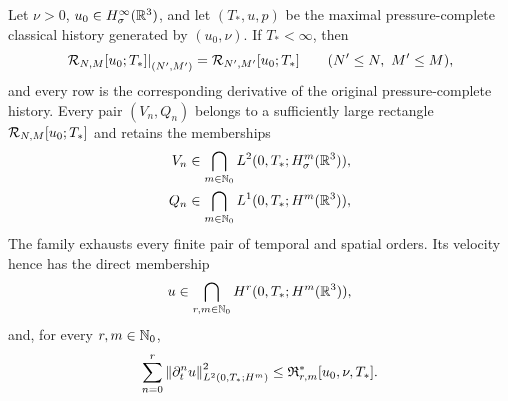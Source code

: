 \begin{theorem}
\label{u:thm:compatible-inverse-intersection}

Let \(\nu>0\), \(u_0\in H^\infty_\sigma(\mathbb R^3)\), and let
\((T_*,u,p)\) be the maximal pressure-complete classical history generated
by \((u_0,\nu)\).  If \(T_*<\infty\), then
\begin{equation}
 \left.\mathcal R_{N,M}[u_0;T_*]\right|_{(N',M')}
 =\mathcal R_{N',M'}[u_0;T_*]
 \qquad(N'\le N,\ M'\le M),
 \label{u:eq:ier-compatible-family}
\end{equation}
and every row is the corresponding derivative of the original
pressure-complete history.  Every pair \((V_n,Q_n)\) belongs to a sufficiently
large rectangle \(\mathcal R_{N,M}[u_0;T_*]\) and retains the memberships
\begin{align}
 V_n&\in\bigcap_{m\in\mathbb N_0}L^2(0,T_*;H^m_\sigma(\mathbb R^3)),
 \label{u:eq:ier-inverse-velocity-coordinate}\\
 Q_n&\in\bigcap_{m\in\mathbb N_0}L^1(0,T_*;H^m(\mathbb R^3)),
 \label{u:eq:ier-inverse-pressure-coordinate}
\end{align}
The family exhausts every finite pair of temporal and spatial orders.  Its
velocity hence has the direct membership
\begin{equation}
 u\in\bigcap_{r,m\in\mathbb N_0}H^r(0,T_*;H^m(\mathbb R^3)),
 \label{u:eq:mixed-sobolev-intersection}
\end{equation}
and, for every \(r,m\in\mathbb N_0\),
\begin{equation}
 \sum_{n=0}^{r}\left\lVert \partial_t^nu\right\rVert_{L^2(0,T_*;H^m)}^2
 \le\mathfrak R_{r,m}^*[u_0,\nu,T_*].
 \label{u:eq:mixed-sobolev-finite-bound}
\end{equation}
\end{theorem}


